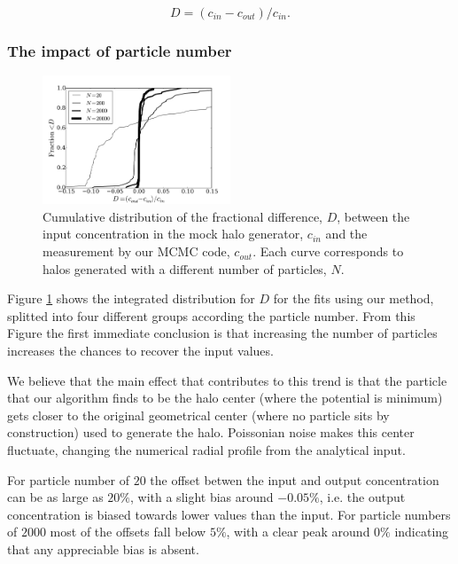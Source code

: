 \documentclass[useAMS,usenatbib]{mn2e}
\begin{document}
\begin{equation}
D=(c_{in}-c_{out})/c_{in}.
\label{eq:D}
\end{equation}

\subsubsection{The impact of particle number}

\begin{figure}
\begin{center}
  \includegraphics[width=0.50\textwidth]{percentual_diff.pdf}
\end{center}
\caption{Cumulative distribution of the fractional difference, $D$, between
  the input concentration in the mock halo generator, $c_{in}$ and the
  measurement by our MCMC code, $c_{out}$. Each curve corresponds to
  halos generated with a different number of particles, $N$.
    \label{fig:results_mocks}}
\end{figure}

Figure \ref{fig:results_mocks} shows the integrated distribution for
$D$ for the fits using our method, splitted into four different groups
according the particle number.
From this Figure the first immediate
conclusion is that increasing the number of particles increases the
chances to recover the input values.

We believe that the main effect that contributes to this trend
is that the particle that our algorithm finds to be the halo center
(where the potential is minimum) gets closer to the original
geometrical center (where no particle sits by construction) used to
generate the halo.  Poissonian noise makes this center fluctuate,
changing the numerical radial profile from the analytical input.

For particle number of $20$ the offset betwen the input and output
concentration can be as large as $20\%$, with a slight bias around
$-0.05\%$, i.e. the output concentration is biased towards lower
values than the input.
For particle numbers of $2000$ most of the offsets fall below $5\%$,
with a clear peak around $0\%$ indicating that any appreciable bias is
absent.
\end{document}

